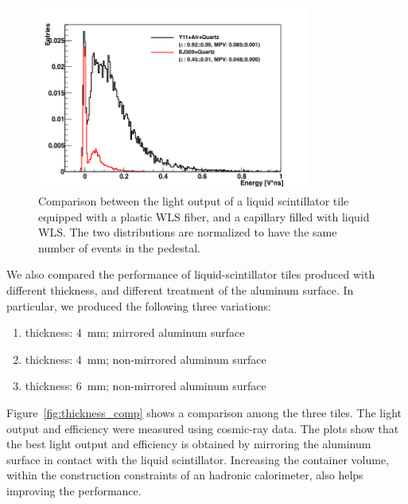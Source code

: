 \documentclass[review]{elsarticle}
\begin{document}
\begin{figure}[!ht]
\begin{center}
\includegraphics[width=0.8\textwidth]{./figures/list_RO_FIBER_all_norm.png}
\caption{Comparison between the light output of a liquid scintillator
  tile equipped with a plastic WLS fiber, and a capillary filled with
  liquid WLS. The two distributions are normalized to have the same
  number of events in the pedestal.}
\label{fig:y11_vs_cap}
\end{center}
\end{figure}

We also compared the performance of liquid-scintillator tiles produced
with different thickness, and different treatment of the aluminum
surface. In particular, we produced the following three variations:
\begin{enumerate}
  \item thickness: 4~mm; mirrored aluminum surface
  \item thickness: 4~mm; non-mirrored aluminum surface
  \item thickness: 6~mm; non-mirrored aluminum surface
\end{enumerate}
Figure~\ref{fig:thickness_comp} shows a comparison among the three
tiles. The light output and efficiency were measured using cosmic-ray
data. The plots show that the best light output and efficiency is
obtained by mirroring the aluminum surface in contact with the liquid
scintillator. Increasing the container volume, within the construction
constraints of an hadronic calorimeter, also helps improving the
performance.
\end{document}
